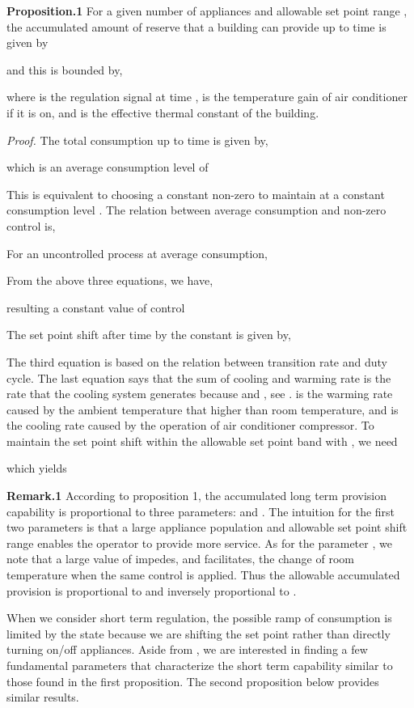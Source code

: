 \documentclass[journal]{IEEEtran}
\begin{document}
\textbf{Proposition.1} For a given number of appliances  and allowable set point range , the accumulated amount of reserve that a building can provide up to time  is given by

and this is bounded by,

where  is the regulation signal at time ,  is the temperature gain of air conditioner if it is on, and  is the effective thermal constant of the building.

\textit{Proof.} The total consumption up to time  is given by,

which is an average consumption level of 

This is equivalent to choosing a constant non-zero  to maintain at a constant consumption level . The relation between average consumption and non-zero control is, 

For an uncontrolled process at average consumption,

From the above three equations, we have,

resulting a constant value of control

The set point shift after time  by the constant  is given by,

The third equation is based on the relation between transition rate and duty cycle. The last equation says that the sum of cooling and warming rate is the rate that the cooling system generates because  and , see \cite{bowen}.  is the warming rate caused by the ambient temperature that higher than room temperature, and  is the cooling rate caused by the operation of air conditioner compressor. To maintain the set point shift within the allowable set point band with , we need

which yields



\textbf{Remark.1} According to proposition 1, the accumulated long term provision capability is proportional to three parameters:  and . The intuition for the first two parameters is that a large appliance population and allowable set point shift range enables the operator to provide more service. As for the parameter , we note that a large value of  impedes, and  facilitates, the change of room temperature when the same control is applied. Thus the allowable accumulated provision is proportional to  and inversely proportional to .

When we consider short term regulation, the possible ramp of consumption is limited by the state  because we are shifting the set point rather than directly turning on/off appliances. Aside from , we are interested in finding a few fundamental parameters that characterize the short term capability similar to those found in the first proposition. The second proposition below provides similar results.
\end{document}
